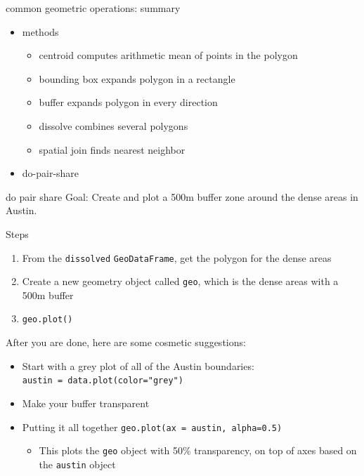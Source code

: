 \documentclass[
  ignorenonframetext,
]{beamer}
\providecommand{\tightlist}{%
  \setlength{\itemsep}{0pt}\setlength{\parskip}{0pt}}\usepackage{longtable,booktabs,array}
\begin{document}
\begin{frame}{common geometric operations: summary}
\label{common-geometric-operations-summary}
\begin{itemize}
\tightlist
\item
  methods

  \begin{itemize}
  \tightlist
  \item
    centroid computes arithmetic mean of points in the polygon
  \item
    bounding box expands polygon in a rectangle
  \item
    buffer expands polygon in every direction
  \item
    dissolve combines several polygons
  \item
    spatial join finds nearest neighbor
  \end{itemize}
\item
  do-pair-share
\end{itemize}
\end{frame}

\begin{frame}[fragile]{do pair share}
\label{do-pair-share}
Goal: Create and plot a 500m buffer zone around the dense areas in
Austin.

Steps

\begin{enumerate}
\tightlist
\item
  From the \texttt{dissolved} \texttt{GeoDataFrame}, get the polygon for
  the dense areas
\item
  Create a new geometry object called \texttt{geo}, which is the dense
  areas with a 500m buffer
\item
  \texttt{geo.plot()}
\end{enumerate}

After you are done, here are some cosmetic suggestions:

\begin{itemize}
\tightlist
\item
  Start with a grey plot of all of the Austin boundaries:
  \texttt{austin\ =\ data.plot(color="grey")}
\item
  Make your buffer transparent
\item
  Putting it all together \texttt{geo.plot(ax\ =\ austin,\ alpha=0.5)}

  \begin{itemize}
  \tightlist
  \item
    This plots the \texttt{geo} object with 50\% transparency, on top of
    axes based on the \texttt{austin} object
  \end{itemize}
\end{itemize}
\end{frame}
\end{document}
